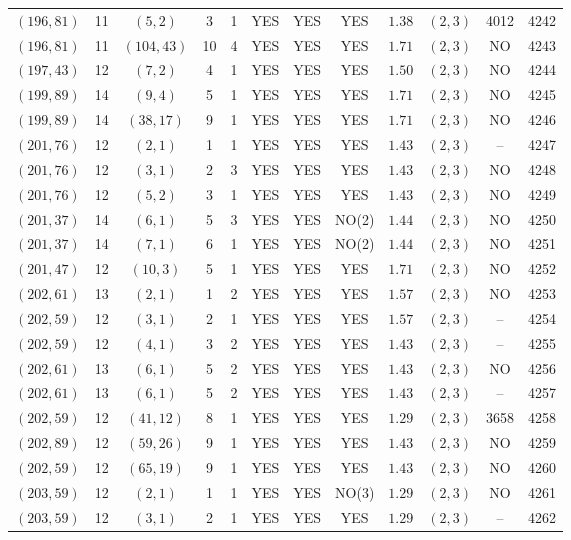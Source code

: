 \begin{longtable}{|c|c|c|c|c|c|c|c|c|c|c|c|}
$(196,81)$ & 11 & $(5,2)$ & 3 & 1 & YES & YES & YES & $1.38$ & $(2,3)$ & 4012 & 4242\\
$(196,81)$ & 11 & $(104,43)$ & 10 & 4 & YES & YES & YES & $1.71$ & $(2,3)$ & NO & 4243\\
$(197,43)$ & 12 & $(7,2)$ & 4 & 1 & YES & YES & YES & $1.50$ & $(2,3)$ & NO & 4244\\
$(199,89)$ & 14 & $(9,4)$ & 5 & 1 & YES & YES & YES & $1.71$ & $(2,3)$ & NO & 4245\\
$(199,89)$ & 14 & $(38,17)$ & 9 & 1 & YES & YES & YES & $1.71$ & $(2,3)$ & NO & 4246\\
$(201,76)$ & 12 & $(2,1)$ & 1 & 1 & YES & YES & YES & $1.43$ & $(2,3)$ & -- & 4247\\
$(201,76)$ & 12 & $(3,1)$ & 2 & 3 & YES & YES & YES & $1.43$ & $(2,3)$ & NO & 4248\\
$(201,76)$ & 12 & $(5,2)$ & 3 & 1 & YES & YES & YES & $1.43$ & $(2,3)$ & NO & 4249\\
$(201,37)$ & 14 & $(6,1)$ & 5 & 3 & YES & YES & NO(2) & $1.44$ & $(2,3)$ & NO & 4250\\
$(201,37)$ & 14 & $(7,1)$ & 6 & 1 & YES & YES & NO(2) & $1.44$ & $(2,3)$ & NO & 4251\\
$(201,47)$ & 12 & $(10,3)$ & 5 & 1 & YES & YES & YES & $1.71$ & $(2,3)$ & NO & 4252\\
$(202,61)$ & 13 & $(2,1)$ & 1 & 2 & YES & YES & YES & $1.57$ & $(2,3)$ & NO & 4253\\
$(202,59)$ & 12 & $(3,1)$ & 2 & 1 & YES & YES & YES & $1.57$ & $(2,3)$ & -- & 4254\\
$(202,59)$ & 12 & $(4,1)$ & 3 & 2 & YES & YES & YES & $1.43$ & $(2,3)$ & -- & 4255\\
$(202,61)$ & 13 & $(6,1)$ & 5 & 2 & YES & YES & YES & $1.43$ & $(2,3)$ & NO & 4256\\
$(202,61)$ & 13 & $(6,1)$ & 5 & 2 & YES & YES & YES & $1.43$ & $(2,3)$ & -- & 4257\\
$(202,59)$ & 12 & $(41,12)$ & 8 & 1 & YES & YES & YES & $1.29$ & $(2,3)$ & 3658 & 4258\\
$(202,89)$ & 12 & $(59,26)$ & 9 & 1 & YES & YES & YES & $1.43$ & $(2,3)$ & NO & 4259\\
$(202,59)$ & 12 & $(65,19)$ & 9 & 1 & YES & YES & YES & $1.43$ & $(2,3)$ & NO & 4260\\
$(203,59)$ & 12 & $(2,1)$ & 1 & 1 & YES & YES & NO(3) & $1.29$ & $(2,3)$ & NO & 4261\\
$(203,59)$ & 12 & $(3,1)$ & 2 & 1 & YES & YES & YES & $1.29$ & $(2,3)$ & -- & 4262\\

\end{longtable}
